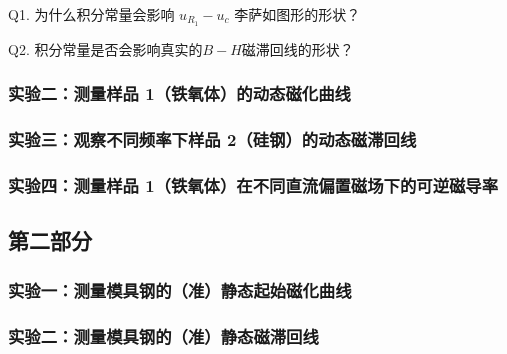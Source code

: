 \documentclass[UTF8]{article}
\theoremstyle{MyLineTheoremStyle} %
\theoremstyle{MyBlockTheoremStyle} %
\theoremstyle{MySubsubsectionStyle} %
\begin{document}
\noindent Q1. 为什么积分常量会影响 $u_{R_1}-u_c$ 李萨如图形的形状？\par



\noindent Q2. 积分常量是否会影响真实的$ B − H $磁滞回线的形状？\par


\subsubsection{实验二：测量样品 1（铁氧体）的动态磁化曲线}


\newpage


\subsubsection{实验三：观察不同频率下样品 2（硅钢）的动态磁滞回线}\label{不同频率硅钢}

\subsubsection{实验四：测量样品 1（铁氧体）在不同直流偏置磁场下的可逆磁导率}

\subsection{第二部分}

\subsubsection{实验一：测量模具钢的（准）静态起始磁化曲线}


\subsubsection{实验二：测量模具钢的（准）静态磁滞回线}
\end{document}
